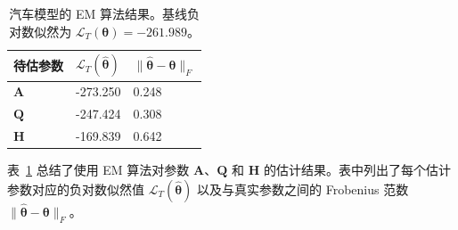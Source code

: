 \begin{table}[tb]
\centering
\caption{汽车模型的 EM 算法结果。基线负对数似然为 \(\mathcal{L}_T({\boldsymbol{\theta}}) = -261.989\)。}
\label{tab: exp car EM results}
\begin{tabular}{lll}
\toprule
\textbf{待估参数} & \textbf{\(\mathcal{L}_T(\widehat{\boldsymbol{\theta}})\)} & \textbf{\(\| \widehat{\boldsymbol{\theta}} - \boldsymbol{\theta} \|_F\)} \\
\midrule
\(\mathbf{A}\) & -273.250 & 0.248 \\
\(\mathbf{Q}\) & -247.424 & 0.308 \\
\(\mathbf{H}\) & -169.839 & 0.642 \\
\bottomrule
\end{tabular}
\end{table}

表~\ref{tab: exp car EM results} 总结了使用 EM 算法对参数 \(\mathbf{A}\)、\(\mathbf{Q}\) 和 \(\mathbf{H}\) 的估计结果。表中列出了每个估计参数对应的负对数似然值 \(\mathcal{L}_T(\widehat{\boldsymbol{\theta}})\) 以及与真实参数之间的 Frobenius 范数 \(\| \widehat{\boldsymbol{\theta}} - \boldsymbol{\theta} \|_F\)。


